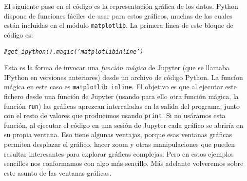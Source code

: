 \documentclass[10pt,a4paper]{article}\usepackage[]{graphicx}\usepackage[]{color}
\makeatletter
\newcommand{\hlcom}[1]{\textcolor[rgb]{0.678,0.584,0.686}{\textit{#1}}}%
\newenvironment{kframe}{%
 \def\at@end@of@kframe{}%
 \ifinner\ifhmode%
  \def\at@end@of@kframe{\end{minipage}}%
  \begin{minipage}{\columnwidth}%
 \fi\fi%
 \def\FrameCommand##1{\hskip\@totalleftmargin \hskip-\fboxsep
 \colorbox{shadecolor}{##1}\hskip-\fboxsep
     \hskip-\linewidth \hskip-\@totalleftmargin \hskip\columnwidth}%
 \MakeFramed {\advance\hsize-\width
   \@totalleftmargin\z@ \linewidth\hsize
   \@setminipage}}%
 {\par\unskip\endMakeFramed%
 \at@end@of@kframe}
\newenvironment{knitrout}{}{} %
\makeatother
\begin{document}
El siguiente paso en el código es la representación gráfica de los datos. Python dispone de funciones fáciles de usar para estos gráficos, muchas de las cuales están incluidas en el módulo {\tt matplotlib}. La primera línea de este bloque de código es:
\begin{knitrout}
\color{fgcolor}\begin{kframe}
\begin{alltt}
\hlcom{#get_ipython().magic('matplotlib inline')}
\end{alltt}
\end{kframe}
\end{knitrout}
Esta es la forma de invocar una {\em función mágica} de Jupyter (que se llamaba IPython en versiones anteriores) desde un archivo de código Python. La funcíon mágica en este caso es {\tt matplotlib inline}. El objetivo es que al ejecutar este fichero desde una función de Jupyter (usando para ello otra función mágica, la función {\tt run}) las gráficas aprezcan intercaladas en la salida del programa, junto con el resto de valores que producimos usando {\tt print}. Si no usáramos esta función, al ejecutar el código en una sesión de Jupyter  cada gráfico se abriría en su propia ventana. Eso tiene algunas ventajas, porque esas ventanas gráficas permiten desplazar el gráfico, hacer zoom  y otras manipulaciones que pueden resultar interesantes para explorar gráficas complejas. Pero en estos ejemplos sencillos nos conformamos con algo más sencillo. Más adelante volveremos sobre este asunto de las ventanas gráficas.
\end{document}
